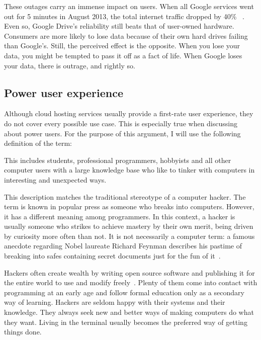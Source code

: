 These outages carry an immense impact on users. When all Google services went out for 5 minutes in August 2013, the total internet traffic dropped by 40\% ~\cite{google_goes_down_for_5_minutes}. Even so, Google Drive's reliability still beats that of user-owned hardware. Consumers are more likely to lose data because of their own hard drives failing than Google's. Still, the perceived effect is the opposite. When you lose your data, you might be tempted to pass it off as a fact of life. When Google loses your data, there is outrage, and rightly so.

\subsection{Power user experience} \label{power_user_experience}

Although cloud hosting services usually provide a first-rate user experience, they do not cover every possible use case. This is especially true when discussing about power users. For the purpose of this argument, I will use the following definition of the term:

\vspace{1em}
\noindent{}
\vspace{1em}

This includes students, professional programmers, hobbyists and all other computer users with a large knowledge base who like to tinker with computers in interesting and unexpected ways.

This description matches the traditional stereotype of a computer hacker. The term is known in popular press as someone who breaks into computers. However, it has a different meaning among programmers. In this context, a hacker is usually someone who strikes to achieve mastery by their own merit, being driven by curiosity more often than not. It is not necessarily a computer term: a famous anecdote regarding Nobel laureate Richard Feynman describes his pastime of breaking into safes containing secret documents just for the fun of it~\cite{feynman}.

Hackers often create wealth by writing open source software and publishing it for the entire world to use and modify freely~\cite{hackers_and_painters}. Plenty of them come into contact with programming at an early age and follow formal education only as a secondary way of learning. Hackers are seldom happy with their systems and their knowledge. They always seek new and better ways of making computers do what they want. Living in the terminal usually becomes the preferred way of getting things done.

